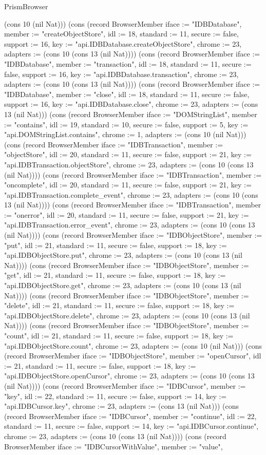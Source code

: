 \begin{lexlean}{PrismBrowser}
\begin{semanticmodule}
{(cons 10 (nil Nat))}) (cons (record BrowserMember {iface := "IDBDatabase", member := "createObjectStore", idl := 18, standard := 11, secure := false, support := 16, key := "api.IDBDatabase.createObjectStore", chrome := 23, adapters := (cons 10 (cons 13 (nil Nat)))}) (cons (record BrowserMember {iface := "IDBDatabase", member := "transaction", idl := 18, standard := 11, secure := false, support := 16, key := "api.IDBDatabase.transaction", chrome := 23, adapters := (cons 10 (cons 13 (nil Nat)))}) (cons (record BrowserMember {iface := "IDBDatabase", member := "close", idl := 18, standard := 11, secure := false, support := 16, key := "api.IDBDatabase.close", chrome := 23, adapters := (cons 13 (nil Nat))}) (cons (record BrowserMember {iface := "DOMStringList", member := "contains", idl := 19, standard := 10, secure := false, support := 5, key := "api.DOMStringList.contains", chrome := 1, adapters := (cons 10 (nil Nat))}) (cons (record BrowserMember {iface := "IDBTransaction", member := "objectStore", idl := 20, standard := 11, secure := false, support := 21, key := "api.IDBTransaction.objectStore", chrome := 23, adapters := (cons 10 (cons 13 (nil Nat)))}) (cons (record BrowserMember {iface := "IDBTransaction", member := "oncomplete", idl := 20, standard := 11, secure := false, support := 21, key := "api.IDBTransaction.complete_event", chrome := 23, adapters := (cons 10 (cons 13 (nil Nat)))}) (cons (record BrowserMember {iface := "IDBTransaction", member := "onerror", idl := 20, standard := 11, secure := false, support := 21, key := "api.IDBTransaction.error_event", chrome := 23, adapters := (cons 10 (cons 13 (nil Nat)))}) (cons (record BrowserMember {iface := "IDBObjectStore", member := "put", idl := 21, standard := 11, secure := false, support := 18, key := "api.IDBObjectStore.put", chrome := 23, adapters := (cons 10 (cons 13 (nil Nat)))}) (cons (record BrowserMember {iface := "IDBObjectStore", member := "get", idl := 21, standard := 11, secure := false, support := 18, key := "api.IDBObjectStore.get", chrome := 23, adapters := (cons 10 (cons 13 (nil Nat)))}) (cons (record BrowserMember {iface := "IDBObjectStore", member := "delete", idl := 21, standard := 11, secure := false, support := 18, key := "api.IDBObjectStore.delete", chrome := 23, adapters := (cons 10 (cons 13 (nil Nat)))}) (cons (record BrowserMember {iface := "IDBObjectStore", member := "count", idl := 21, standard := 11, secure := false, support := 18, key := "api.IDBObjectStore.count", chrome := 23, adapters := (cons 10 (nil Nat))}) (cons (record BrowserMember {iface := "IDBObjectStore", member := "openCursor", idl := 21, standard := 11, secure := false, support := 18, key := "api.IDBObjectStore.openCursor", chrome := 23, adapters := (cons 10 (cons 13 (nil Nat)))}) (cons (record BrowserMember {iface := "IDBCursor", member := "key", idl := 22, standard := 11, secure := false, support := 14, key := "api.IDBCursor.key", chrome := 23, adapters := (cons 13 (nil Nat))}) (cons (record BrowserMember {iface := "IDBCursor", member := "continue", idl := 22, standard := 11, secure := false, support := 14, key := "api.IDBCursor.continue", chrome := 23, adapters := (cons 10 (cons 13 (nil Nat)))}) (cons (record BrowserMember {iface := "IDBCursorWithValue", member := "value", }
\end{semanticmodule}
\end{lexlean}
